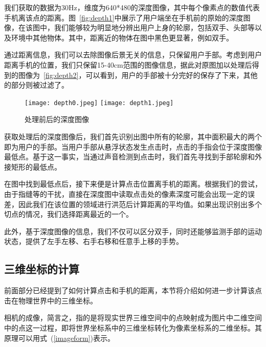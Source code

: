 我们获取的数据为30Hz，维度为640*480的深度图像，其中每个像素点的数值代表手机离该点的距离。图~\ref{fig:depth1}中展示了用户端坐在手机前的原始的深度图像，在该图中，我们能够较为明显地分辨出用户上身的轮廓，包括双手、头部等以及环境中其他物体。其中，距离近的物体在图中黑色更显著，例如双手。

通过距离信息，我们可以去除图像后景无关的信息，只保留用户手部。考虑到用户距离手机的位置，我们只保留15-40cm范围的图像信息，据此对原图加以处理后得到的图像为~\ref{fig:depth2}，可以看到，用户的手部被十分完好的保存了下来，其他的部分则被过滤了。
\begin{figure}[h]
  \centering%
    {\texttt{[image: depth0.jpeg]}}%
  \hspace{4em}%
      {\texttt{[image: depth1.jpeg]}}
  \caption{处理前后的深度图像}
  \label{fig:depth-image}
\end{figure}

获取处理后的深度图像后，我们首先识别出图中所有的轮廓，其中面积最大的两个即为用户的手部。当用户手部从悬浮状态发生点击时，点击的手指会位于深度图像最低点。基于这一事实，当通过声音检测到点击时，我们首先寻找到手部轮廓和外接矩形的最低点。

在图中找到最低点后，接下来便是计算点击位置离手机的距离。根据我们的尝试，由于指缝等的干扰，直接在深度图中读取点击处的像素深度可能会出现一定的误差，因此我们在该位置的领域进行洪范后计算距离的平均值。如果出现识别出多个切点的情况，我们选择距离最近的一个。

此外，基于深度图像的信息，我们不仅可以区分双手，同时还能够监测手部的运动状态，提供了左手左移、右手右移和任意手上移的手势。

\subsection{三维坐标的计算}
前面部分已经提到了如何计算点击和手机的距离，本节将介绍如何进一步计算该点击在物理世界中的三维坐标。

相机的成像，简言之，指的是将现实世界三维空间中的点映射成为图片中二维空间中的点这一过程，即将世界坐标系中的三维坐标转化为像素坐标系的二维坐标。其原理可以用式~(\ref{imageform})表示。

